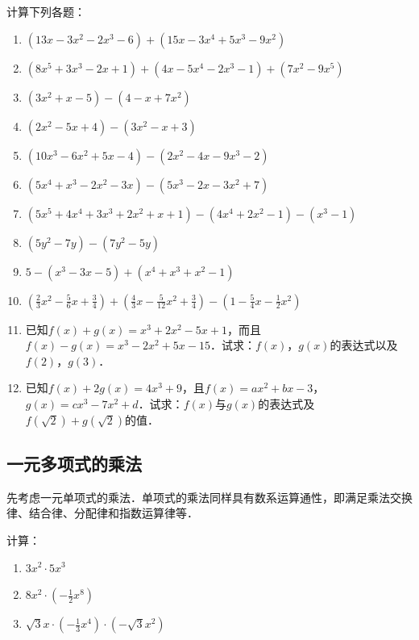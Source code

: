\begin{ex}
    计算下列各题：
\begin{enumerate}
    \item $(13x-3x^2-2x^3-6)+ (15x-3x^4+5x^3-9x^2)$
    \item $(8x^5+3x^3-2x+1)+(4x-5x^4-2x^3-1)+(7x^2-9x^5)$
    \item $(3x^2+x-5)-(4-x+7x^2)$
    \item $(2x^2-5x+4)-(3x^2-x+3)$
    \item $(10x^3-6x^2+5x-4)-(2x^2-4x-9x^3-2)$
    \item $(5x^4+x^3-2x^2-3x)-(5x^3-2x-3x^2+7)$
    \item $(5x^5+4x^4+3x^3+2x^2+x+1)-(4x^4+2x^2-1)-(x^3-1)$
    \item $(5y^2-7y)-(7y^2-5y)$
    \item $5-(x^3-3x-5)+(x^4+x^3+x^2-1)$
    \item $\left(\frac{2}{3}x^2-\frac{5}{6}x+\frac{3}{4}\right)+\left(\frac{4}{3}x-\frac{5}{12}x^2+\frac{3}{4}\right)-\left(1-\frac{5}{4}x-\frac{1}{2}x^2\right)$
    \item 已知$f(x)+g(x)=x^3+2x^2-5x+1$，而且$f(x)-g(x)=x^3-2x^2+5x-15$．试求：$f(x)$，$g(x)$的表达式以及$f(2)$，$g(3)$．
    \item 已知$f(x)+2g(x)=4x^3+9$，且$f(x)=ax^2+bx-3$，$g(x)=cx^3-7x^2+d$．试求：$f(x)$与$g(x)$的表达式及$f(\sqrt{2})+g(\sqrt{2})$的值．
\end{enumerate}
\end{ex}

\subsection{一元多项式的乘法}

先考虑一元单项式的乘法．单项式的乘法同样具有数系运算通性，即满足乘法交换律、结合律、分配律和指数运算律等．

\begin{example}
    计算：
    \begin{enumerate}
        \item $3x^2\cdot 5x^3$
        \item $8x^2\cdot \left(-\frac{1}{2}x^8\right)$
        \item $\sqrt{3}x\cdot \left(-\frac{1}{3}x^4\right)\cdot \left(-\sqrt{3}x^2\right)$
    \end{enumerate}

\end{example}

